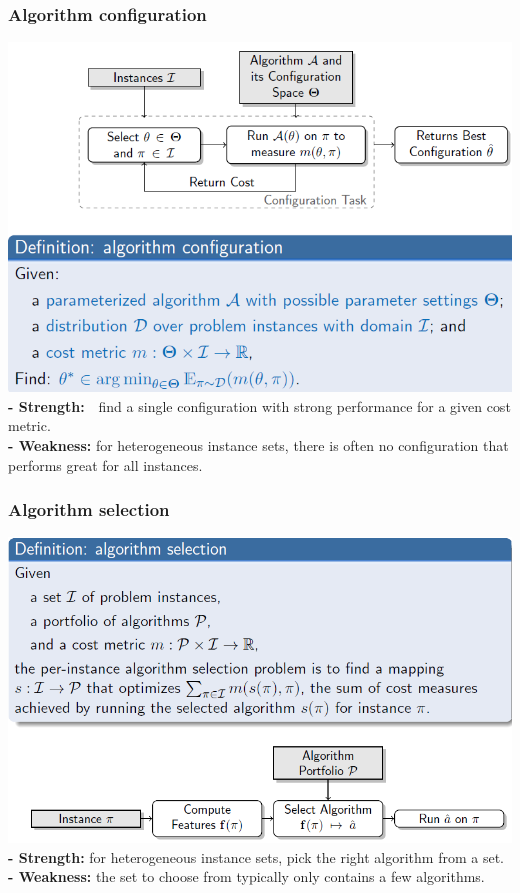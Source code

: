 \documentclass{article}
\begin{document}
\subsubsection{Algorithm configuration}
\includegraphics[scale=0.7]{40.png}\\
\textbf{- Strength: } find a single configuration with strong performance for a
given cost metric.\\
\textbf{- Weakness: }for heterogeneous instance sets, there is often no configuration that performs great for all instances.\\
\subsubsection{Algorithm selection}
\includegraphics[scale=0.7]{41.png}\\
\textbf{- Strength: }for heterogeneous instance sets, pick the right algorithm
from a set.
\textbf{- Weakness: }the set to choose from typically only contains a few algorithms.
\end{document}
